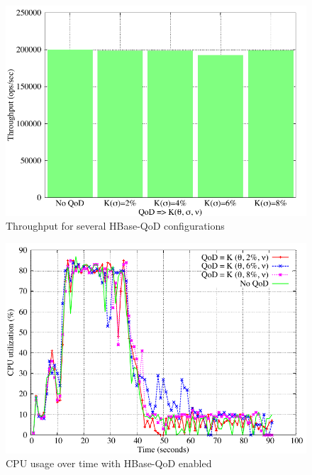 \begin{figure}[h]
\centering
\includegraphics[width=0.8\linewidth]{figs/throughput.pdf}
\caption{Throughput for several HBase-QoD configurations}
\label{fig-throughput}
\end{figure}

\begin{figure}[h]
\centering
\includegraphics[width=0.8\linewidth]{figs/cpu.pdf}
\caption{CPU usage over time with HBase-QoD enabled}
\label{fig-cpu}
\end{figure}





